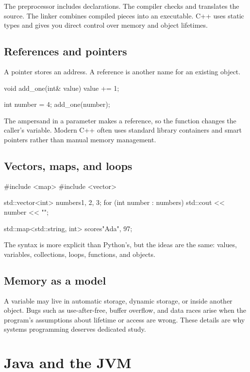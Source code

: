 \documentclass[11pt,openany,oneside]{book}
\newcommand{\inlinecode}[1]{\texttt{\small\detokenize{#1}}}
\begin{document}
The preprocessor includes declarations. The compiler checks and translates the source. The linker combines compiled pieces into an executable. C++ uses static types and gives you direct control over memory and object lifetimes.

\section{References and pointers}

A pointer stores an address. A reference is another name for an existing object.

\begin{code}[language=C++]
void add_one(int& value) {
    value += 1;
}

int number = 4;
add_one(number);
\end{code}

The ampersand in a parameter makes \inlinecode{value} a reference, so the function changes the caller's variable. Modern C++ often uses standard library containers and smart pointers rather than manual memory management.

\section{Vectors, maps, and loops}

\begin{code}[language=C++]
#include <map>
#include <vector>

std::vector<int> numbers{1, 2, 3};
for (int number : numbers) {
    std::cout << number << "\n";
}

std::map<std::string, int> scores{{"Ada", 97}};
\end{code}

The syntax is more explicit than Python's, but the ideas are the same: values, variables, collections, loops, functions, and objects.

\section{Memory as a model}

A variable may live in automatic storage, dynamic storage, or inside another object. Bugs such as use-after-free, buffer overflow, and data races arise when the program's assumptions about lifetime or access are wrong. These details are why systems programming deserves dedicated study.

\chapter{Java and the JVM}
\end{document}
